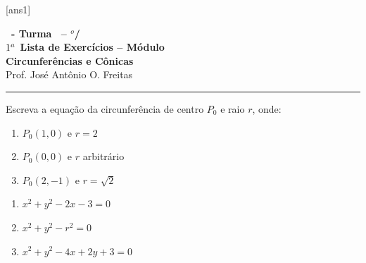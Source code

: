 \documentclass[12pt]{exam}
\begin{document}
[ans1]

\begin{center}
    {\Large\bf \disciplina\ - Turma \turma\ -- \semestre$^{o}$/\ano} \\ \vspace{9pt} {\large\bf
        $1^a$ Lista de Exercícios -- Módulo \numeromodulo\\ Circunferências e Cônicas}\\ \vspace{9pt} Prof. José Antônio O. Freitas
\end{center}

\hrule

\vspace{.6cm}

\begin{exercicio}
    Escreva a equação da circunferência de centro $P_0$ e raio $r$, onde:
    \begin{enumerate}[label=({\alph*})]
        \item $P_0(1,0)$ e $r = 2$
        \item $P_0(0,0)$ e $r$ arbitrário
        \item $P_0(2,-1)$ e $r = \sqrt{2}$
    \end{enumerate}
    \begin{solucao}
        \begin{enumerate}[label=({\alph*})]
            \item $x^2 + y^2 -2x - 3 = 0$
            \item $x^2 + y^2 - r^2 = 0$
            \item $x^2 + y^2 - 4x + 2y + 3 = 0$
        \end{enumerate}
    \end{solucao}
\end{exercicio}
\end{document}
